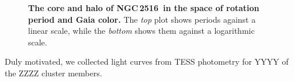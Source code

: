 \documentclass[12pt,twocolumn,tighten]{aastex63}
\newcommand{\cn}{NGC\,2516} %
\begin{document}
\begin{figure}[t]
	\begin{center}
		\leavevmode
	
	\end{center}
	\vspace{-0.7cm}
	\caption{ {\bf The core and halo of \cn\ in the space of rotation
    period and Gaia color.}
    The {\it top} plot shows periods against a linear scale, while the
    {\it bottom}  shows them against a logarithmic scale.
		\label{fig:rot}
	}
\end{figure}



Duly motivated, we collected light curves from TESS photometry
for YYYY of the ZZZZ cluster members.
\end{document}
